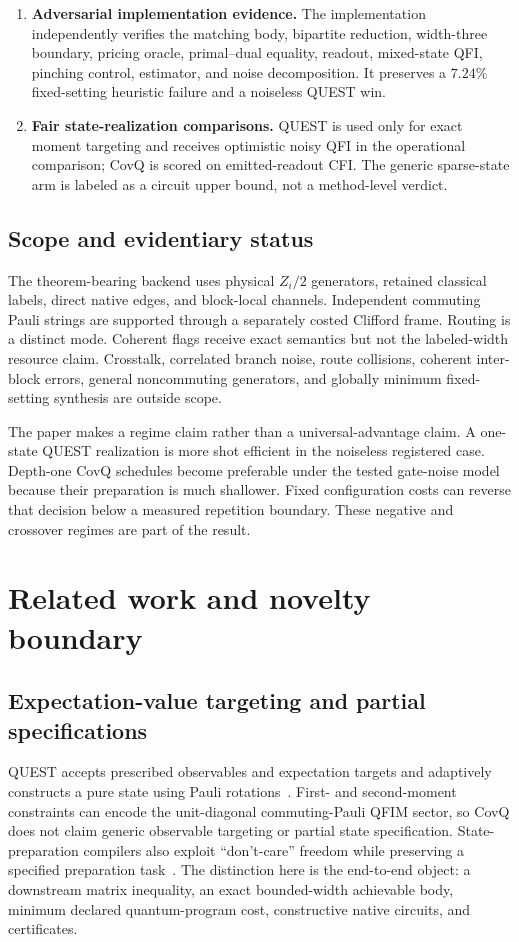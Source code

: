 \documentclass[11pt]{article}
\theoremstyle{definition}
\theoremstyle{remark}
\begin{document}
\begin{enumerate}[label=\textbf{C\arabic*.}]
  \item \textbf{Adversarial implementation evidence.} The implementation independently verifies the matching body, bipartite reduction, width-three boundary, pricing oracle, primal--dual equality, readout, mixed-state QFI, pinching control, estimator, and noise decomposition. It preserves a $7.24\%$ fixed-setting heuristic failure and a noiseless QUEST win.
  \item \textbf{Fair state-realization comparisons.} QUEST is used only for exact moment targeting and receives optimistic noisy QFI in the operational comparison; CovQ is scored on emitted-readout CFI. The generic sparse-state arm is labeled as a circuit upper bound, not a method-level verdict.
\end{enumerate}

\subsection{Scope and evidentiary status}
The theorem-bearing backend uses physical $Z_i/2$ generators, retained classical labels, direct native edges, and block-local channels. Independent commuting Pauli strings are supported through a separately costed Clifford frame. Routing is a distinct mode. Coherent flags receive exact semantics but not the labeled-width resource claim. Crosstalk, correlated branch noise, route collisions, coherent inter-block errors, general noncommuting generators, and globally minimum fixed-setting synthesis are outside scope.

The paper makes a regime claim rather than a universal-advantage claim. A one-state QUEST realization is more shot efficient in the noiseless registered case. Depth-one CovQ schedules become preferable under the tested gate-noise model because their preparation is much shallower. Fixed configuration costs can reverse that decision below a measured repetition boundary. These negative and crossover regimes are part of the result.

\section{Related work and novelty boundary}

\subsection{Expectation-value targeting and partial specifications}
QUEST accepts prescribed observables and expectation targets and adaptively constructs a pure state using Pauli rotations~\cite{MahapatraKadiri2026}. First- and second-moment constraints can encode the unit-diagonal commuting-Pauli QFIM sector, so CovQ does not claim generic observable targeting or partial state specification. State-preparation compilers also exploit ``don't-care'' freedom while preserving a specified preparation task~\cite{WangTanCong2025}. The distinction here is the end-to-end object: a downstream matrix inequality, an exact bounded-width achievable body, minimum declared quantum-program cost, constructive native circuits, and certificates.
\end{document}
